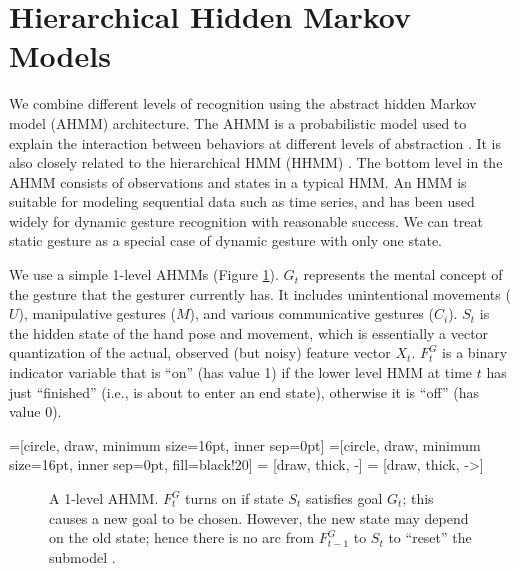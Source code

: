 \section{Hierarchical Hidden Markov Models}
We combine different levels of recognition using the abstract hidden Markov
model (AHMM) architecture. The AHMM is a probabilistic model used to explain the
interaction between behaviors at different levels of abstraction \cite{johns05}.
It is also closely related to the hierarchical HMM (HHMM) \cite{fine98}. The bottom level in the AHMM 
consists of observations and states in a typical HMM. An HMM is suitable for 
modeling sequential data such as time series, and has been used widely for 
dynamic gesture recognition with reasonable success. We can treat static gesture 
as a special case of dynamic gesture with only one state.

We use a simple 1-level AHMMs \cite{murphy02} (Figure
\ref{fig:amms}). $G_t$ represents the mental concept of the gesture that the
gesturer currently has. It includes unintentional movements ($U$), manipulative
gestures ($M$), and various communicative gestures ($C_i$). $S_t$ is the hidden
state of the hand pose and movement, which is essentially a vector quantization of the actual, observed 
(but noisy) feature vector $X_t$. $F_t^G$ is a binary indicator variable that is
``on'' (has value 1) if the lower level HMM at time $t$ has just ``finished''
(i.e., is about to enter an end state), otherwise it is ``off'' (has value 0).

=[circle, draw, minimum size=16pt, inner sep=0pt]
=[circle, draw, minimum size=16pt, inner sep=0pt,
               fill=black!20] 
 = [draw, thick, -]
 = [draw, thick, ->]

\begin{figure}[h]
\centering
  \caption{A 1-level AHMM. $F_t^G$ turns on if state $S_t$ satisfies goal
  $G_t$; this causes a new goal to be chosen. However, the new state may depend
  on the old state; hence there is no arc from $F_{t-1}^G$ to $S_t$ to
  ``reset'' the submodel \cite{murphy02}.}
  \label{fig:amms}
\end{figure}


